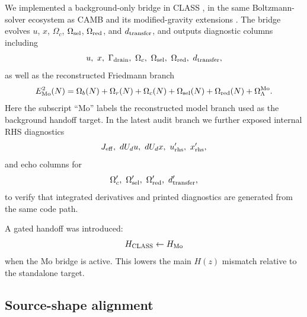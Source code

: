 ﻿\documentclass[11pt,prd,preprint,nofootinbib,amsmath,amssymb]{revtex4-2}
\begin{document}
We implemented a background-only bridge in CLASS \cite{CLASS}, in the same
Boltzmann-solver ecosystem as CAMB and its modified-gravity extensions
\cite{CAMB,EFTCAMB,hiCLASS}. The bridge evolves $u$, $x$, $\Omega_c$,
$\Omega_{\rm sel}$, $\Omega_{\rm red}$, and $d_{\rm transfer}$, and outputs
diagnostic columns including
\begin{equation}
u,\ x,\ \Gamma_{\rm drain},\ \Omega_c,\ \Omega_{\rm sel},\ \Omega_{\rm red},\ d_{\rm transfer},
\end{equation}
as well as the reconstructed Friedmann branch
\begin{equation}
E_{\rm Mo}^2(N)
=
\Omega_b(N)+\Omega_r(N)+\Omega_c(N)+\Omega_{\rm sel}(N)+\Omega_{\rm red}(N)+\Omega_\Lambda^{\rm Mo}.
\end{equation}
Here the subscript ``Mo'' labels the reconstructed model branch used as the
background handoff target.
In the latest audit branch we further exposed internal RHS diagnostics
\begin{equation}
J_{\rm eff},\ dU_du,\ dU_dx,\ u'_{\rm rhs},\ x'_{\rm rhs},
\end{equation}
and echo columns for
\begin{equation}
\Omega_c',\ \Omega_{\rm sel}',\ \Omega_{\rm red}',\ d_{\rm transfer}',
\end{equation}
to verify that integrated derivatives and printed diagnostics are generated from the same code path.

A gated handoff was introduced:
\begin{equation}
H_{\rm CLASS}\leftarrow H_{\rm Mo}
\end{equation}
when the Mo bridge is active. This lowers the main $H(z)$ mismatch relative to the standalone target.

\subsection{Source-shape alignment}
\end{document}
